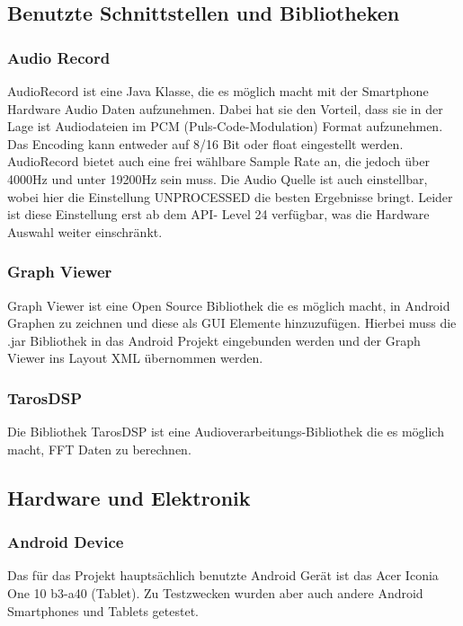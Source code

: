 \documentclass{article}
\begin{document}
{	\subsection{Benutzte Schnittstellen und Bibliotheken}

		\subsubsection{Audio Record}
			AudioRecord ist eine Java Klasse, die es möglich macht mit der Smartphone Hardware Audio Daten aufzunehmen. Dabei hat sie den Vorteil, dass sie in der Lage ist Audiodateien im PCM (Puls-Code-Modulation) Format aufzunehmen. Das Encoding kann entweder auf 8/16 Bit oder float eingestellt werden. AudioRecord bietet auch eine frei wählbare Sample Rate an, die jedoch über 4000Hz und unter 19200Hz sein muss. Die Audio Quelle ist auch einstellbar, wobei hier die Einstellung UNPROCESSED die besten Ergebnisse bringt. Leider ist diese Einstellung erst ab dem API- Level 24 verfügbar, was die Hardware Auswahl weiter einschränkt.

		\subsubsection{Graph Viewer}
			Graph Viewer ist eine Open Source Bibliothek die es möglich macht, in Android Graphen zu zeichnen und diese als GUI Elemente hinzuzufügen. Hierbei muss die .jar Bibliothek in das Android Projekt eingebunden werden und der Graph Viewer ins Layout XML übernommen werden.

		\subsubsection{TarosDSP}
			Die Bibliothek TarosDSP ist eine Audioverarbeitungs-Bibliothek die es möglich macht, FFT Daten zu berechnen.

	\subsection{Hardware und Elektronik}


		\subsubsection{Android Device}
			Das für das Projekt hauptsächlich benutzte Android Gerät ist das Acer Iconia One 10 b3-a40 (Tablet). Zu Testzwecken wurden aber auch andere Android Smartphones und Tablets getestet.



}
\end{document}
